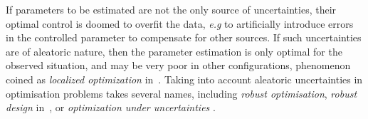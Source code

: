 \documentclass[preprint, 1p]{elsarticle}
\newcommand{\arthur}[1]{{\itshape\color{cyan} ({#1})}}
\begin{document}
If parameters to be estimated are not the only source of uncertainties, their optimal control 
is doomed to overfit the data, \emph{e.g} to artificially introduce errors in the controlled parameter to compensate for other sources. If such uncertainties are of aleatoric nature, then the parameter estimation is only optimal for the observed situation, and may be very poor in other configurations, phenomenon coined as \textit{localized optimization} in~\cite{huyse_free-form_2001}.
Taking into account aleatoric uncertainties in optimisation problems takes several names, including \textit{robust optimisation}, \textit{robust design} in~\cite{lelievre_consideration_2016}, or \textit{optimization under uncertainties} \citep{petrone_robustness_2011, seshadri_density-matching_2014,cook_horsetail_2018}. 


\end{document}
